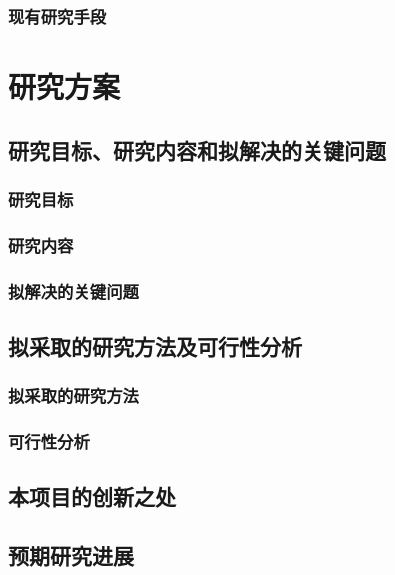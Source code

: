 \documentclass{ctexart}
\begin{document}
\subsubsection{现有研究手段}

\section{研究方案}
\subsection{研究目标、研究内容和拟解决的关键问题}
\subsubsection{研究目标}
\subsubsection{研究内容}
\subsubsection{拟解决的关键问题}
\subsection{拟采取的研究方法及可行性分析}
\subsubsection{拟采取的研究方法}
\subsubsection{可行性分析}

\subsection{本项目的创新之处}
\subsection{预期研究进展}
\end{document}

